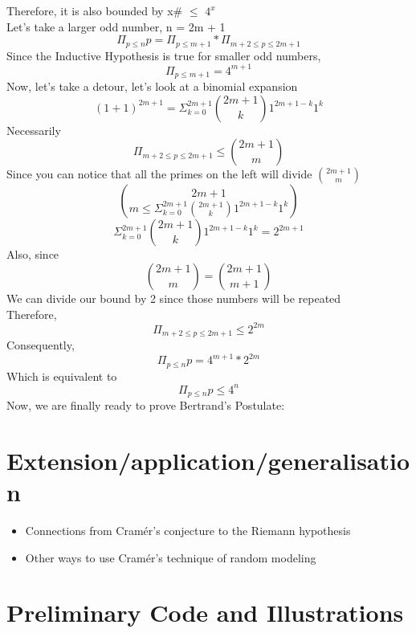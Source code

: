 \documentclass[conference]{IEEEtran}
\begin{document}
Therefore, it is also bounded by x\# $\leq$ $4^x$\\
Let's take a larger odd number, n = 2m + 1\\
\[
    \Pi_{p \leq n}p = \Pi_{p\leq m + 1} * \Pi_{m + 2 \leq p \leq 2m + 1}
\]
Since the Inductive Hypothesis is true for smaller odd numbers,
\[
    \Pi_{p\leq m + 1} = 4^{m + 1}
\]
Now, let's take a detour, let's look at a binomial expansion
\[
    (1 + 1)^{2m + 1} = \Sigma^{2m + 1}_{k = 0}{{2m + 1} \choose k}1^{2m + 1 - k}{1^{k}}
\]
Necessarily 
\[
    \Pi_{m + 2 \leq p \leq 2m + 1} \leq {{2m + 1} \choose m}
\]
Since you can notice that all the primes on the left will divide ${2m + 1} \choose {m}$
\[
    {2m + 1} \choose {m} \leq \Sigma^{2m + 1}_{k = 0}{{2m + 1} \choose k}1^{2m + 1 - k}{1^{k}}
\]
\[
    \Sigma^{2m + 1}_{k = 0}{{2m + 1} \choose k}1^{2m + 1 - k}{1^{k}} = 2^{2m + 1}
\]
Also, since 
\[
    {{2m + 1} \choose {m}} = {{2m + 1} \choose {m + 1}}
\]
We can divide our bound by 2 since those numbers will be repeated\\
Therefore,
\[
    \Pi_{m + 2 \leq p \leq 2m + 1} \leq 2^{2m}
\]
Consequently,
\[
     \Pi_{p \leq n}p = 4^{m + 1} * 2^{2m}
\]
Which is equivalent to
\[
    \Pi_{p \leq n}p \leq 4^{n}
\]
Now, we are finally ready to prove Bertrand's Postulate:

\section{Extension/application/generalisation}
\begin{itemize}
    \item Connections from Cram\'er's conjecture to the Riemann hypothesis
    \item Other ways to use Cram\'er's technique of random modeling
\end{itemize}


\section{Preliminary Code and Illustrations}
\end{document}
